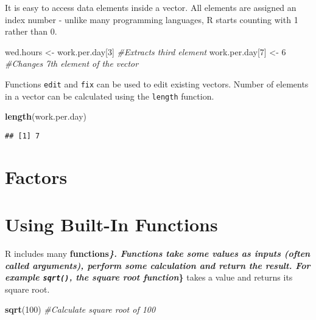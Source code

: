 \documentclass[
]{krantz}
\makeatletter
\newenvironment{Shaded}{\begin{snugshade}}{\end{snugshade}}
\newcommand{\CommentTok}[1]{\textcolor[rgb]{0.37,0.37,0.37}{\textit{#1}}}
\newcommand{\DecValTok}[1]{\textcolor[rgb]{0.06,0.06,0.06}{#1}}
\newcommand{\KeywordTok}[1]{\textcolor[rgb]{0.27,0.27,0.27}{\textbf{#1}}}
\newcommand{\NormalTok}[1]{#1}
\newcommand{\StringTok}[1]{\textcolor[rgb]{0.5,0.5,0.5}{#1}}
\newenvironment{kframe}{%
\medskip{}
\setlength{\fboxsep}{.8em}
 \def\at@end@of@kframe{}%
 \ifinner\ifhmode%
  \def\at@end@of@kframe{\end{minipage}}%
  \begin{minipage}{\columnwidth}%
 \fi\fi%
 \def\FrameCommand##1{\hskip\@totalleftmargin \hskip-\fboxsep
 \colorbox{shadecolor}{##1}\hskip-\fboxsep
     \hskip-\linewidth \hskip-\@totalleftmargin \hskip\columnwidth}%
 \MakeFramed {\advance\hsize-\width
   \@totalleftmargin\z@ \linewidth\hsize
   \@setminipage}}%
 {\par\unskip\endMakeFramed%
 \at@end@of@kframe}
\renewenvironment{Shaded}{\begin{kframe}}{\end{kframe}}
\makeatother
\begin{document}
It is easy to access data elements inside a vector. All elements are assigned an index number - unlike many programming languages, R starts counting with 1 rather than 0.

\begin{Shaded}
\begin{Highlighting}[]
\NormalTok{wed.hours <-}\StringTok{ }\NormalTok{work.per.day[}\DecValTok{3}\NormalTok{] }\CommentTok{#Extracts third element}
\NormalTok{work.per.day[}\DecValTok{7}\NormalTok{] <-}\StringTok{ }\DecValTok{6} \CommentTok{#Changes 7th element of the vector}
\end{Highlighting}
\end{Shaded}

Functions \texttt{edit} and \texttt{fix} can be used to edit existing vectors. Number of elements in a vector can be calculated using the \texttt{length} function.

\begin{Shaded}
\begin{Highlighting}[]
\KeywordTok{length}\NormalTok{(work.per.day)}
\end{Highlighting}
\end{Shaded}

\begin{verbatim}
## [1] 7
\end{verbatim}

\hypertarget{factors}{%
\section{Factors}\label{factors}}

\hypertarget{using-built-in-functions}{%
\section{Using Built-In Functions}\label{using-built-in-functions}}

R includes many \textbf{functions\emph{\}\textbf{. Functions take some values as inputs (often called }arguments\textbf{), perform some calculation and return the result. For example \texttt{sqrt()}, the }square root function}\}} takes a value and returns its square root.

\begin{Shaded}
\begin{Highlighting}[]
\KeywordTok{sqrt}\NormalTok{(}\DecValTok{100}\NormalTok{) }\CommentTok{#Calculate square root of 100}
\end{Highlighting}
\end{Shaded}
\end{document}
